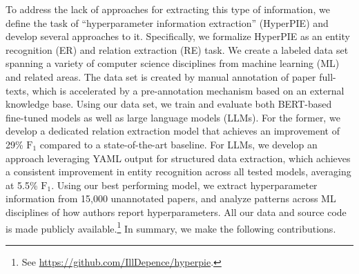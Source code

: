 

To address the lack of approaches for extracting this type of information, we define the task of ``hyperparameter information extraction'' (HyperPIE) and develop several approaches to it. Specifically, we formalize HyperPIE as an entity recognition (ER) and relation extraction (RE) task. We create a labeled data set spanning a variety of computer science disciplines from machine learning (ML) and related areas. The data set is created by manual annotation of paper full-texts, which is accelerated by a pre-annotation mechanism based on an external knowledge base. Using our data set, we train and evaluate both BERT-based~\cite{devlin2019} fine-tuned models as well as large language models (LLMs).
For the former, we develop a dedicated relation extraction model that achieves an improvement of 29\% $\text{F}_1$ compared to a state-of-the-art baseline.
For LLMs, we develop an approach leveraging YAML output for structured data extraction, which achieves a consistent improvement in entity recognition across all tested models, averaging at 5.5\% $\text{F}_1$.
Using our best performing model, we extract hyperparameter information from 
15,000 unannotated papers, and analyze patterns across ML disciplines of how authors report hyperparameters.
All our data and source code is made publicly available.\footnote{See \url{https://github.com/IllDepence/hyperpie}.}
%
%
In summary, we make the following contributions.

